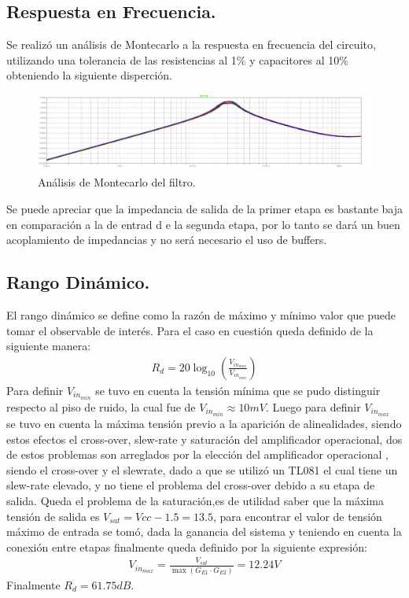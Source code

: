 \subsection{Respuesta en Frecuencia.}
Se realizó un análisis de Montecarlo a la respuesta en frecuencia del circuito, utilizando una tolerancia de las resistencias al 1$\%$ y capacitores al 10$\%$ obteniendo la siguiente disperción.
\begin{figure}[H]
	\centering
	\includegraphics[width=\textwidth]{Imagenes-Ej2/mcF.png}
	\caption{Análisis de Montecarlo del filtro.}
	\label{fig:mcrauch}
\end{figure}
Se puede apreciar que la impedancia de salida de la primer etapa es bastante baja en comparación a la de entrad d e la segunda etapa, por lo tanto se dará un buen acoplamiento de impedancias y no será necesario el uso de buffers.
\subsection{Rango Dinámico.}
El rango dinámico se define como la razón de máximo y mínimo valor que puede tomar el observable de interés. Para el caso en cuestión queda definido de la siguiente manera:
\begin{align}
R_d = 20 \log_{10} \left( \frac{V_{in_{max}}}{V_{in_{min}}} \right)
\end{align}
Para definir $V_{in_{min}}$ se tuvo en cuenta la tensión mínima que se pudo distinguir respecto al piso de ruido, la cual fue de $V_{in_{min}} \approx 10mV$. Luego para definir $V_{in_{max}}$ se tuvo en cuenta la máxima tensión previo a la aparición de alinealidades, siendo estos efectos el cross-over, slew-rate y saturación del amplificador operacional, dos de estos problemas son arreglados por la elección del amplificador operacional , siendo el cross-over y el slewrate, dado a que se utilizó un TL081 el cual tiene un slew-rate elevado, y no tiene el problema del cross-over debido a su etapa de salida. Queda el problema de la saturación,es de utilidad saber que la máxima tensión de salida es $V_{sat} = Vcc-1.5 =13.5$, para encontrar el valor de tensión máximo de entrada se tomó, dada la ganancia del sistema y teniendo en cuenta la conexión entre etapas finalmente queda definido por la siguiente expresión:
\begin{align}
V_{in_{max}}=\frac{V_{sat}}{  \max(G_{E1} \cdot G_{E2} )} = 12.24V
\end{align}
Finalmente $R_d = 61.75dB$.

